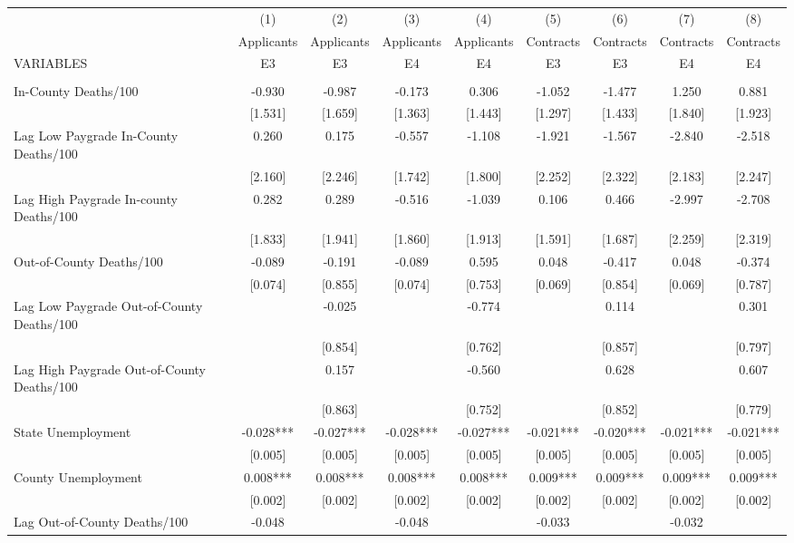 \documentclass[]{article}
\begin{document}
\begin{tabular}{lcccccccc} \hline
 & (1) & (2) & (3) & (4) & (5) & (6) & (7) & (8) \\
 & Applicants & Applicants & Applicants & Applicants & Contracts & Contracts & Contracts & Contracts \\
VARIABLES & E3 & E3 & E4 & E4 & E3 & E3 & E4 & E4 \\ \hline
 &  &  &  &  &  &  &  &  \\
In-County Deaths/100 & -0.930 & -0.987 & -0.173 & 0.306 & -1.052 & -1.477 & 1.250 & 0.881 \\
 & [1.531] & [1.659] & [1.363] & [1.443] & [1.297] & [1.433] & [1.840] & [1.923] \\
Lag Low Paygrade In-County Deaths/100 & 0.260 & 0.175 & -0.557 & -1.108 & -1.921 & -1.567 & -2.840 & -2.518 \\
 & [2.160] & [2.246] & [1.742] & [1.800] & [2.252] & [2.322] & [2.183] & [2.247] \\
Lag High Paygrade In-county Deaths/100 & 0.282 & 0.289 & -0.516 & -1.039 & 0.106 & 0.466 & -2.997 & -2.708 \\
 & [1.833] & [1.941] & [1.860] & [1.913] & [1.591] & [1.687] & [2.259] & [2.319] \\
Out-of-County Deaths/100 & -0.089 & -0.191 & -0.089 & 0.595 & 0.048 & -0.417 & 0.048 & -0.374 \\
 & [0.074] & [0.855] & [0.074] & [0.753] & [0.069] & [0.854] & [0.069] & [0.787] \\
Lag Low Paygrade Out-of-County Deaths/100 &  & -0.025 &  & -0.774 &  & 0.114 &  & 0.301 \\
 &  & [0.854] &  & [0.762] &  & [0.857] &  & [0.797] \\
Lag High Paygrade Out-of-County Deaths/100 &  & 0.157 &  & -0.560 &  & 0.628 &  & 0.607 \\
 &  & [0.863] &  & [0.752] &  & [0.852] &  & [0.779] \\
State Unemployment & -0.028*** & -0.027*** & -0.028*** & -0.027*** & -0.021*** & -0.020*** & -0.021*** & -0.021*** \\
 & [0.005] & [0.005] & [0.005] & [0.005] & [0.005] & [0.005] & [0.005] & [0.005] \\
County Unemployment & 0.008*** & 0.008*** & 0.008*** & 0.008*** & 0.009*** & 0.009*** & 0.009*** & 0.009*** \\
 & [0.002] & [0.002] & [0.002] & [0.002] & [0.002] & [0.002] & [0.002] & [0.002] \\
Lag Out-of-County Deaths/100 & -0.048 &  & -0.048 &  & -0.033 &  & -0.032 &  \\

\end{tabular}
\end{document}
